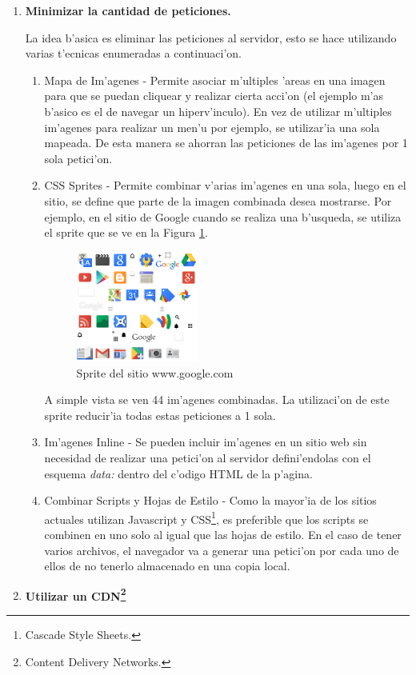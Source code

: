 \begin{enumerate}

\item \textbf{Minimizar la cantidad de peticiones.}

La idea b'asica es eliminar las peticiones al servidor, esto se hace utilizando varias t'ecnicas enumeradas a continuaci'on.

	\begin{enumerate}
	\item Mapa de Im'agenes - Permite asociar m'ultiples 'areas en una imagen para que se puedan cliquear y realizar cierta acci'on (el ejemplo m'as b'asico es el de navegar un hiperv'inculo). En vez de utilizar m'ultiples im'agenes para realizar un men'u por ejemplo, se utilizar'ia una sola mapeada. De esta manera se ahorran las peticiones de las im'agenes por 1 sola petici'on.
	\vspace{2cm}
	\item CSS Sprites - Permite combinar v'arias im'agenes en una sola, luego en el sitio, se define que parte de la imagen combinada desea mostrarse. Por ejemplo, en el sitio de Google cuando se realiza una b'usqueda, se utiliza el sprite que se ve en la Figura \ref{css_sprites}.
		\begin{figure}[htbp]
		\begin{center}
			\includegraphics[width=150px]{img/css_sprites}
			\caption{\small Sprite del sitio www.google.com}
		\end{center}
		\label{css_sprites}
		\end{figure}

	A simple vista se ven 44 im'agenes combinadas. La utilizaci'on de este sprite reducir'ia todas estas peticiones a 1 sola.
	\item Im'agenes Inline - Se pueden incluir im'agenes en un sitio web sin necesidad de realizar una petici'on al servidor defini'endolas con el esquema \textit{data:} \citep{rfcData} dentro del c'odigo HTML de la p'agina.
	\item Combinar Scripts y Hojas de Estilo - Como la mayor'ia de los sitios actuales utilizan Javascript y CSS\footnote{Cascade Style Sheets.}, es preferible que los scripts se combinen en uno solo al igual que las hojas de estilo. En el caso de tener varios archivos, el navegador va a generar una petici'on por cada uno de ellos de no tenerlo almacenado en una copia local.
	\end{enumerate}
\item \textbf{Utilizar un CDN\footnote{Content Delivery Networks.}}


\end{enumerate}
